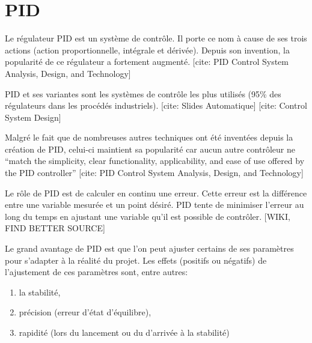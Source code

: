 
\section{PID}

Le régulateur PID est un système de contrôle. Il porte ce nom à cause de ses trois actions (action proportionnelle, intégrale et dérivée). Depuis son invention, la popularité de ce régulateur a fortement augmenté. [cite: PID Control System Analysis, Design, and Technology]

PID et ses variantes sont les systèmes de contrôle les plus utilisés (95\% des régulateurs dans les procédés industriels). [cite: Slides Automatique] [cite: Control System Design]

Malgré le fait que de nombreuses autres techniques ont été inventées depuis la création de PID, celui-ci maintient sa popularité car aucun autre contrôleur ne ``match the simplicity, clear functionality, applicability, and ease of use offered by the PID controller'' [cite: PID Control System Analysis, Design, and Technology]

Le rôle de PID est de calculer en continu une erreur. Cette erreur est la différence entre une variable mesurée et un point désiré. PID tente de minimiser l'erreur au long du temps en ajustant une variable qu'il est possible de contrôler. [WIKI, FIND BETTER SOURCE] %

Le grand avantage de PID est que l'on peut ajuster certains de ses paramètres pour s'adapter à la réalité du projet. Les effets (positifs ou négatifs) de l'ajustement de ces paramètres sont, entre autres:
\begin{enumerate}
\item la stabilité,
\item précision (erreur d'état d'équilibre),
\item rapidité (lors du lancement ou du d'arrivée à la stabilité)
\end{enumerate}
